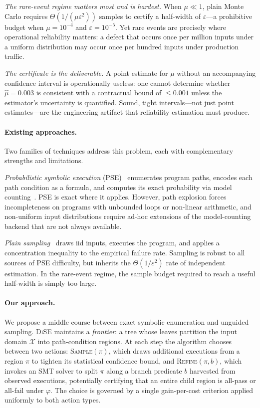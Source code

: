 \documentclass[runningheads]{llncs}
\newcommand{\inX}{\mathcal{X}}
\newcommand{\prop}{\varphi}
\newcommand{\mutrue}{\mu}
\newcommand{\toolname}{\textsc{DiSE}}
\begin{document}
\emph{The rare-event regime matters most and is hardest.}  When
$\mutrue \ll 1$, plain Monte Carlo requires $\Theta(1/(\mutrue
\varepsilon^2))$ samples to certify a half-width of $\varepsilon$---a
prohibitive budget when $\mutrue = 10^{-4}$ and $\varepsilon =
10^{-5}$.  Yet rare events are precisely where operational reliability
matters: a defect that occurs once per million inputs under a uniform
distribution may occur once per hundred inputs under production
traffic.

\emph{The certificate is the deliverable.}  A point estimate for
$\mutrue$ without an accompanying confidence interval is operationally
useless: one cannot determine whether $\hat{\mu} = 0.003$ is
consistent with a contractual bound of $\le 0.001$ unless the
estimator's uncertainty is quantified.  Sound, tight intervals---not
just point estimates---are the engineering artifact that reliability
estimation must produce.

\paragraph{Existing approaches.}
Two families of techniques address this problem, each with
complementary strengths and limitations.

\emph{Probabilistic symbolic execution}
(PSE)~\cite{geldenhuys2012pse,filieri2015tacas,borges2014compositional}
enumerates program paths, encodes each path condition as a formula,
and computes its exact probability via model
counting~\cite{chakraborty2013approxmc,yang2023approxmc6}.  PSE is
exact where it applies.  However, path explosion forces incompleteness
on programs with unbounded loops or non-linear arithmetic, and
non-uniform input distributions require ad-hoc extensions of the
model-counting backend that are not always available.

\emph{Plain sampling}~\cite{sampson2014passert,kwiatkowska2011prism}
draws iid inputs, executes the program, and applies a concentration
inequality to the empirical failure rate.  Sampling is robust to all
sources of PSE difficulty, but inherits the $\Theta(1/\varepsilon^2)$
rate of independent estimation.  In the rare-event regime, the sample
budget required to reach a useful half-width is simply too large.

\paragraph{Our approach.}
We propose a middle course between exact symbolic enumeration and
unguided sampling.  \toolname{} maintains a \emph{frontier}: a tree whose leaves
partition the input domain $\inX$ into path-condition regions.  At
each step the algorithm chooses between two actions:
\textsc{Sample}$(\pi)$, which draws additional executions from a
region $\pi$ to tighten its statistical confidence bound, and
\textsc{Refine}$(\pi, b)$, which invokes an SMT solver to split $\pi$
along a branch predicate $b$ harvested from observed executions,
potentially certifying that an entire child region is all-pass or
all-fail under $\prop$.  The choice is governed by a single
gain-per-cost criterion applied uniformly to both action types.
\end{document}
